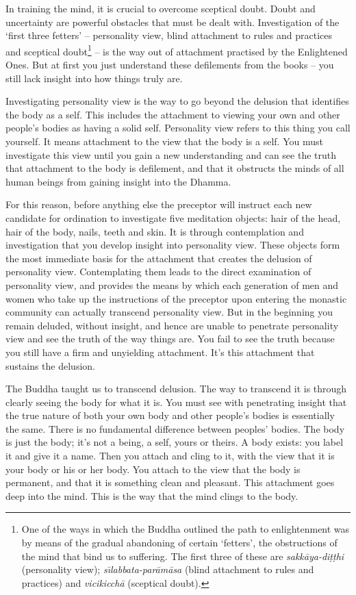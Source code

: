 
In training the mind, it is crucial to overcome sceptical doubt. Doubt and uncertainty are powerful obstacles that must be dealt with. Investigation of the `first three fetters' -- personality view, blind attachment to rules and practices and sceptical doubt\footnote{One of the ways in which the Buddha outlined the path to enlightenment was by means of the gradual abandoning of certain `fetters', the obstructions of the mind that bind us to suffering. The first three of these are \textit{sakk\=aya-di\d{t}\d{t}hi} (personality view); \textit{s\={\i}labbata-par\=am\=asa} (blind attachment to rules and practices) and \textit{vicikicch\=a} (sceptical doubt).} -- is the way out of attachment practised by the Enlightened Ones. But at first you just understand these defilements from the books -- you still lack insight into how things truly are.

Investigating personality view is the way to go beyond the delusion that identifies the body as a self. This includes the attachment to viewing your own and other people's bodies as having a solid self. Personality view refers to this thing you call yourself. It means attachment to the view that the body is a self. You must investigate this view until you gain a new understanding and can see the truth that attachment to the body is defilement, and that it obstructs the minds of all human beings from gaining insight into the Dhamma.

For this reason, before anything else the preceptor will instruct each new candidate for ordination to investigate five meditation objects: hair of the head, hair of the body, nails, teeth and skin. It is through contemplation and investigation that you develop insight into personality view. These objects form the most immediate basis for the attachment that creates the delusion of personality view. Contemplating them leads to the direct examination of personality view, and provides the means by which each generation of men and women who take up the instructions of the preceptor upon entering the monastic community can actually transcend personality view. But in the beginning you remain deluded, without insight, and hence are unable to penetrate personality view and see the truth of the way things are. You fail to see the truth because you still have a firm and unyielding attachment. It's this attachment that sustains the delusion.

The Buddha taught us to transcend delusion. The way to transcend it is through clearly seeing the body for what it is. You must see with penetrating insight that the true nature of both your own body and other people's bodies is essentially the same. There is no fundamental difference between peoples' bodies. The body is just the body; it's not a being, a self, yours or theirs. A body exists: you label it and give it a name. Then you attach and cling to it, with the view that it is your body or his or her body. You attach to the view that the body is permanent, and that it is something clean and pleasant. This attachment goes deep into the mind. This is the way that the mind clings to the body.

